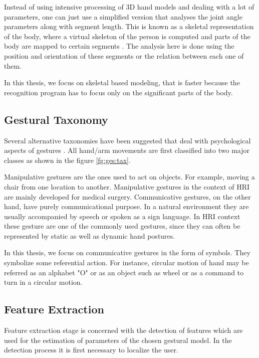 Instead of using intensive processing of 3D hand models and dealing with a lot of parameters, one can just use a simplified version that analyses the joint angle parameters along with segment length. This is known as a skeletal representation of the body, where a virtual skeleton of the person is computed and parts of the body are mapped to certain segments \cite{4}. The analysis here is done using the position and orientation of these segments or the relation between each one of them.

In this thesis, we focus on skeletal based modeling, that is faster because the recognition program has to focus only on the significant parts of the body.

\subsection{Gestural Taxonomy} Several alternative taxonomies have been suggested that deal with psychological aspects of gestures \cite{4}. All hand/arm movements are first classified into two major classes as shown in the figure \ref{fg:ges:tax}.



Manipulative gestures are the ones used to act on objects. For example, moving a chair from one location to another. Manipulative gestures in the context of HRI are mainly developed for medical surgery. Communicative gestures, on the other hand, have purely communicational purpose. In a natural environment they are usually accompanied by speech or spoken as a sign language. In HRI context these gesture are one of the commonly used gestures, since they can often be represented by static as well as dynamic hand postures.

In this thesis, we focus on communicative gestures in the form of symbols. They symbolize some referential action. For instance, circular motion of hand may be referred as an alphabet "O" or as an object such as wheel or as a command to turn in a circular motion.

\subsection{Feature Extraction} Feature extraction stage is concerned with the detection of features which are used for the estimation of parameters of the chosen gestural model. In the detection process it is first necessary to localize the user. 



